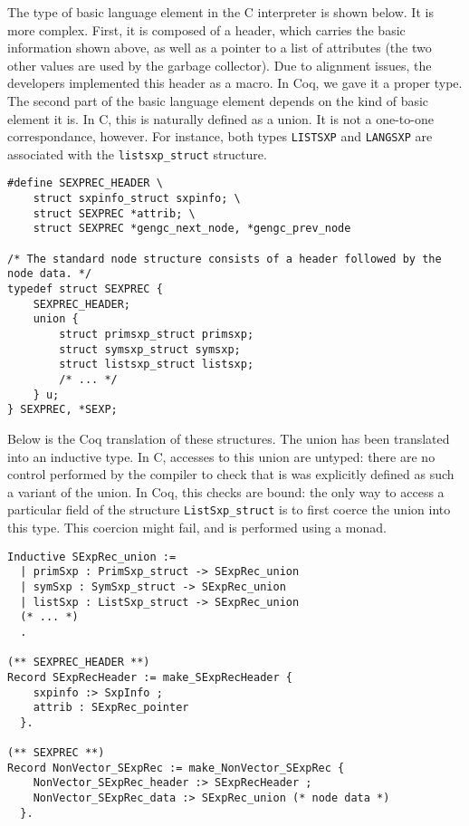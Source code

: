 \documentclass{article}
\newcommand\Coq{Coq}
\newcommand\Cn{C}
\begin{document}
The type of basic language element in the \Cn{} interpreter is shown below.
It is more complex.
First, it is composed of a header,
which carries the basic information shown above,
as well as a pointer to a list of attributes
(the two other values are used by the garbage collector).
Due to alignment issues, the developers implemented this header
as a macro.
In \Coq{}, we gave it a proper type.
The second part of the basic language element
depends on the kind of basic element it is.
In \Cn{}, this is naturally defined as a union.
It is not a one-to-one correspondance, however.
For instance, both types \texttt{LISTSXP} and \texttt{LANGSXP}
are associated with the \texttt{listsxp_struct} structure.
\begin{verbatim}
#define SEXPREC_HEADER \
    struct sxpinfo_struct sxpinfo; \
    struct SEXPREC *attrib; \
    struct SEXPREC *gengc_next_node, *gengc_prev_node

/* The standard node structure consists of a header followed by the node data. */
typedef struct SEXPREC {
    SEXPREC_HEADER;
    union {
        struct primsxp_struct primsxp;
        struct symsxp_struct symsxp;
        struct listsxp_struct listsxp;
        /* ... */
    } u;
} SEXPREC, *SEXP;
\end{verbatim}
Below is the \Coq{} translation of these structures.
The union has been translated into an inductive type.
In \Cn{}, accesses to this union are untyped:
there are no control performed by the compiler to check that
is was explicitly defined as such a variant of the union.
In \Coq{}, this checks are bound:
the only way to access a particular field of the structure
\texttt{ListSxp_struct} is to first coerce
the union into this type.
This coercion might fail, and is performed using a monad.
\begin{verbatim}
Inductive SExpRec_union :=
  | primSxp : PrimSxp_struct -> SExpRec_union
  | symSxp : SymSxp_struct -> SExpRec_union
  | listSxp : ListSxp_struct -> SExpRec_union
  (* ... *)
  .

(** SEXPREC_HEADER **)
Record SExpRecHeader := make_SExpRecHeader {
    sxpinfo :> SxpInfo ;
    attrib : SExpRec_pointer
  }.

(** SEXPREC **)
Record NonVector_SExpRec := make_NonVector_SExpRec {
    NonVector_SExpRec_header :> SExpRecHeader ;
    NonVector_SExpRec_data :> SExpRec_union (* node data *)
  }.
\end{verbatim}
\end{document}
